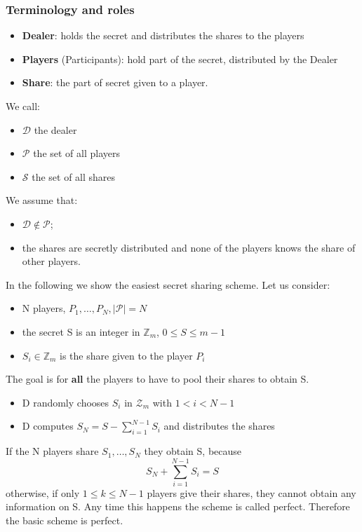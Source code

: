 \documentclass[a4paper, 10pt, titlepage]{article}
\begin{document}
\subsubsection*{Terminology and roles}
\begin{itemize}
\item \textbf{Dealer}: holds the secret and distributes the shares to the players
\item \textbf{Players} (Participants): hold part of the secret, distributed by the Dealer
\item \textbf{Share}: the part of secret given to a player.
\end{itemize}
We call:
\begin{itemize}
\item $\mathcal{D}$ the dealer
\item $\mathcal{P}$ the set of all players
\item $\mathcal{S}$ the set of all shares
\end{itemize}
We assume that:
\begin{itemize}
\item $\mathcal{D} \notin \mathcal{P}$;
\item the shares are secretly distributed and none of the players knows the share of other players.
\end{itemize}
In the following we show the easiest secret sharing scheme.
Let us consider:
\begin{itemize}
\item N players, $P_1, \dots, P_N, |\mathcal{P}| = N$
\item the secret S is an integer in $\mathbb{Z}_m$, $0 \leq S \leq m - 1$
\item $S_i \in \mathbb{Z}_m$ is the share given to the player $P_i$
\end{itemize}
The goal is for \textbf{all} the players to have to pool their shares to obtain S.
\begin{itemize}
\item D randomly chooses $S_i$ in $\mathcal{Z}_m$ with $1 < i < N-1$
\item D computes $S_N = S - \sum_{i=1}^{N-1} S_i$ and distributes the shares
\end{itemize}
If the N players share $S_1, \dots, S_N$ they obtain S, because
$$S_N + \sum_{i=1}^{N-1} S_i = S$$
otherwise, if only $1 \leq k \leq N - 1$ players give their shares, they cannot obtain any information on S. Any time this happens the scheme is called perfect. Therefore the basic scheme is perfect.
\end{document}
